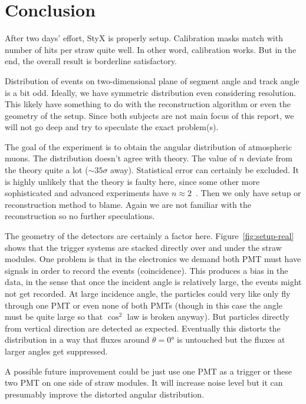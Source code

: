 
\section{Conclusion}\label{sec:con}
After two days' effort, StyX is properly setup. Calibration masks match with number of hits per straw quite well. In other word, calibration works. But in the end, the overall result is borderline satisfactory. 

Distribution of events on two-dimensional plane of segment angle and track angle is a bit odd. Ideally, we have symmetric distribution even considering resolution. This likely have something to do with the reconstruction algorithm or even the geometry of the setup. Since both subjects are not main focus of this report, we will not go deep and try to speculate the exact problem(s).

The goal of the experiment is to obtain the angular distribution of atmospheric muons. The distribution doesn't agree with theory. The value of $n$ deviate from the theory quite a lot ($\sim 35\sigma$ away). Statistical error can certainly be excluded. It is highly unlikely that the theory is faulty here, since some other more sophisticated and advanced experiments have $n\approx2$~\cite{BAHMANABADI20191}\cite{Shukla}. Then we only have setup or reconstruction method to blame. Again we are not familiar with the reconstruction so no further speculations. 

The geometry of the detectors are certainly a factor here. Figure~\ref{fig:setup-real} shows that the trigger systems are stacked directly over and under the straw modules. One problem is that in the electronics we demand both PMT must have signals in order to record the events (coincidence). This produces a bias in the data, in the sense that once the incident angle is relatively large, the events might not get recorded. At large incidence angle, the particles could very like only fly through one PMT or even none of both PMTs (though in this case the angle must be quite large so that $\cos^2$ law is broken anyway). But particles directly from vertical direction are detected as expected. Eventually this distorts the distribution in a way that fluxes around $\theta=\ang{0}$ is untouched but the fluxes at larger angles get suppressed.

A possible future improvement could be just use one PMT as a trigger or these two PMT on one side of straw modules. It will increase noise level but it can presumably improve the distorted angular distribution. 

